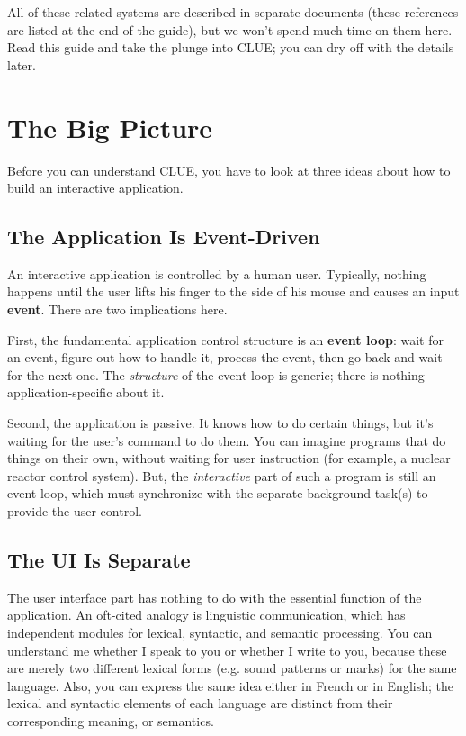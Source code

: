 All of these related systems are described in separate documents (these
references are listed at the end of the guide), but we won't spend much time on
them here. Read this guide and take the plunge into CLUE; you can dry off with
the details later.

\section{The Big Picture}
Before you can understand CLUE, you have to look at three ideas about how
to build an interactive application. 


\subsection{The Application Is Event-Driven} 
An interactive application is controlled by a human user. Typically, nothing
happens until the user lifts his finger to the side of his mouse and causes
an input {\bf event}.  There are two implications here.

First, the fundamental
application control structure is an {\bf event loop}: wait for an event, figure
out how to handle it, process the event, then go back and wait for the next one.
The {\em structure} of the event loop is generic; there is nothing
application-specific about it. 

Second, the application is passive. It knows how to do certain things, but it's
waiting for the user's command to do them. You can imagine programs that do
things on their own, without waiting for user instruction (for example, a
nuclear reactor control system). But, the {\em interactive} part of such a
program is still an event loop, which must synchronize with the separate
background task(s) to provide the user control.


\subsection{The UI Is Separate} 
The user interface part has nothing to do with the essential function of the
application. An oft-cited analogy is linguistic communication, which has
independent modules for lexical, syntactic, and semantic processing. You can
understand me whether I speak to you or whether I write to you, because these
are merely two different lexical forms (e.g. sound patterns or marks) for the
same language.  Also, you can express the same idea either in French or in
English; the lexical and syntactic elements of each language are distinct from
their corresponding meaning, or semantics. 

